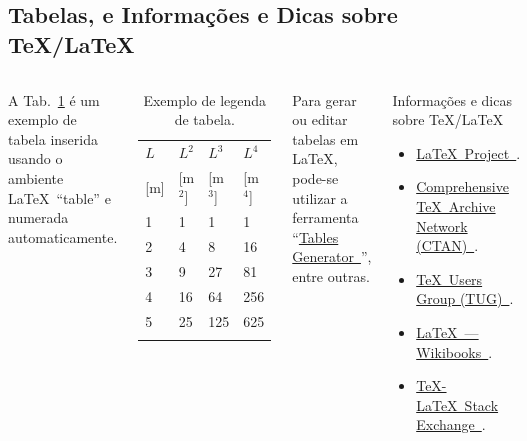 \documentclass[%
  10pt,%
  aspectratio = 43,%
  compress,%
  t,%
  english,%
  brazilian,%
]{beamer}
\begin{document}
\subsection{Tabelas, e Informações e Dicas sobre \TeX/\LaTeX}\label{ssec:matmet2}

\begin{frame}
\begin{columns}[T]
A Tab.~\ref{tab:Ldimens} é um exemplo de tabela inserida usando o ambiente \LaTeX\ \enquote{table} e numerada automaticamente.
\begin{table}[!htb]
\centering%
\caption{Exemplo de legenda de tabela.}%
\label{tab:Ldimens}
\begin{tabular*}{\columnwidth}{@{\extracolsep{\fill}}llll}
\toprule
$L$   & $L^2$     & $L^3$     & $L^4$     \\
{[\si{\meter}]} & {[\si{\meter}$^2$]} & {[\si{\meter}$^3$]} & {[\si{\meter}$^4$]} \\
\midrule
1     & 1         & 1         & 1         \\
2     & 4         & 8         & 16        \\
3     & 9         & 27        & 81        \\
4     & 16        & 64        & 256       \\
5     & 25        & 125       & 625       \\
\bottomrule
\addlinespace
\end{tabular*}
\end{table}
Para gerar ou editar tabelas em \LaTeX, pode-se utilizar a ferramenta \enquote{\href{http://www.tablesgenerator.com/}{Tables Generator~\linkicon}}, entre outras.
\begin{block}{Informações e dicas sobre \TeX/\LaTeX}
\begin{itemize}
\item \href{http://www.latex-project.org/}{\LaTeX\ Project~\linkicon}.
\item \href{http://www.ctan.org/}{Comprehensive \TeX\ Archive Network (CTAN)~\linkicon}.
\item \href{http://www.tug.org/}{\TeX\ Users Group (TUG)~\linkicon}.
\item \href{http://en.wikibooks.org/wiki/LaTeX/}{\LaTeX\ --- Wikibooks~\linkicon}.
\item \href{http://tex.stackexchange.com/}{\TeX-\LaTeX\ Stack Exchange~\linkicon}.
\end{itemize}
\end{block}
\end{columns}
\end{frame}
\end{document}
